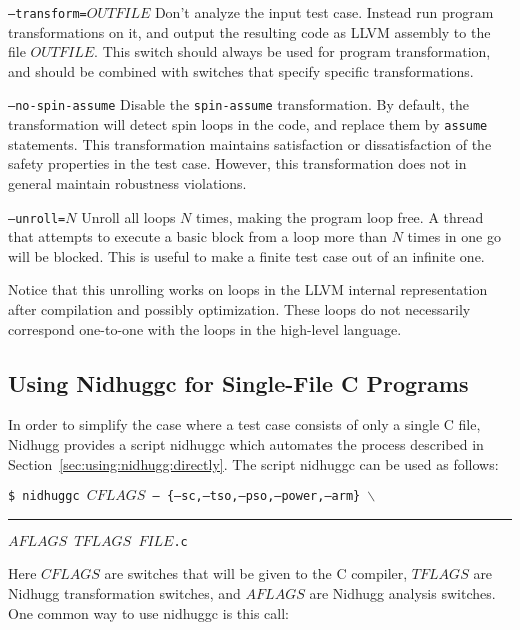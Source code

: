\documentclass[a4paper]{article}
\begin{document}
\begin{description}
\item{\texttt{--transform=$OUTFILE$}}
%
  Don't analyze the input test case. Instead run program
  transformations on it, and output the resulting code as LLVM
  assembly to the file $OUTFILE$. This switch should always be used
  for program transformation, and should be combined with switches
  that specify specific transformations.
\item{\texttt{--no-spin-assume}}
%
  Disable the \texttt{spin-assume} transformation. By default, the
  transformation will detect spin loops in the code, and replace them
  by \texttt{assume} statements. This transformation maintains
  satisfaction or dissatisfaction of the safety properties in the test
  case. However, this transformation does not in general maintain
  robustness violations.
\item{\texttt{--unroll=$N$}}
%
  Unroll all loops $N$ times, making the program loop free. A thread
  that attempts to execute a basic block from a loop more than $N$
  times in one go will be blocked. This is useful to make a finite
  test case out of an infinite one.

  Notice that this unrolling works on loops in the LLVM internal
  representation after compilation and possibly optimization. These
  loops do not necessarily correspond one-to-one with the loops in the
  high-level language.
\end{description}

\subsection{Using Nidhuggc for Single-File C Programs}\label{sec:using:nidhuggc}

In order to simplify the case where a test case consists of only a
single C file, Nidhugg provides a script \textsf{nidhuggc} which
automates the process described in
Section~\ref{sec:using:nidhugg:directly}. The script \textsf{nidhuggc}
can be used as follows:

\vspace{5pt}
\noindent
\texttt{\$ nidhuggc $CFLAGS$ -- \{--sc,--tso,--pso,--power,--arm\} $\backslash$}\\
\rule{20pt}{0pt}\texttt{$AFLAGS$ $TFLAGS$ $FILE$.c}

\vspace{5pt}\noindent
%
Here $CFLAGS$ are switches that will be given to the C compiler,
$TFLAGS$ are Nidhugg transformation switches, and $AFLAGS$ are Nidhugg
analysis switches. One common way to use \textsf{nidhuggc} is this
call:
\end{document}
